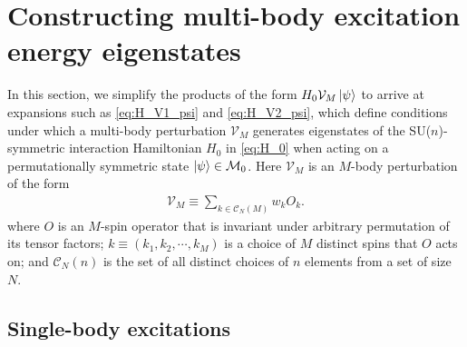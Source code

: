 \documentclass[nofootinbib,notitlepage,11pt]{revtex4-2}
\newcommand{\p}[1]{\left(#1\right)} %
\newcommand{\1}{\mathds{1}}
\newcommand{\C}{\mathcal{C}}
\newcommand{\M}{\mathcal{M}}
\newcommand{\V}{\mathcal{V}}
\begin{document}
\section{Constructing multi-body excitation energy eigenstates}
\label{sec:eigenstates}

In this section, we simplify the products of the form
$H_0\V_M\ket\psi$ to arrive at expansions such as \eqref{eq:H_V1_psi}
and \eqref{eq:H_V2_psi}, which define conditions under which a
multi-body perturbation $\V_M$ generates eigenstates of the
SU($n$)-symmetric interaction Hamiltonian $H_0$ in \eqref{eq:H_0} when
acting on a permutationally symmetric state $\ket\psi\in\M_0$.  Here
$\V_M$ is an $M$-body perturbation of the form
\begin{align}
  \V_M \equiv \sum_{k\in\C_N\p{M}} w_k O_k.
\end{align}
where $O$ is an $M$-spin operator that is invariant under arbitrary
permutation of its tensor factors; $k\equiv\p{k_1,k_2,\cdots,k_M}$ is
a choice of $M$ distinct spins that $O$ acts on; and $\C_N\p{n}$ is
the set of all distinct choices of $n$ elements from a set of size
$N$.

\subsection{Single-body excitations}
\label{sec:H_V1_psi}
\end{document}
